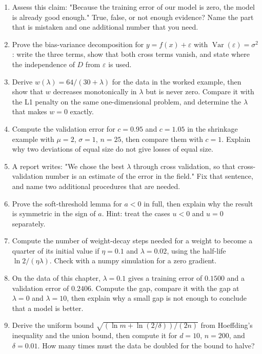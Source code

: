 \begin{latihan}
\begin{enumerate}
  \item Assess this claim: "Because the training error of our model is zero, the model
        is already good enough." True, false, or not enough evidence? Name the part that
        is mistaken and one additional number that you need.
  \item Prove the bias-variance decomposition for $y=f(x)+\varepsilon$ with
        $\operatorname{Var}(\varepsilon)=\sigma^2$: write the three terms, show that both
        cross terms vanish, and state where the independence of $D$ from $\varepsilon$
        is used.
  \item Derive $w(\lambda)=64/(30+\lambda)$ for the data in the worked example, then show
        that $w$ decreases monotonically in $\lambda$ but is never zero. Compare it with
        the L1 penalty on the same one-dimensional problem, and determine the $\lambda$
        that makes $w=0$ exactly.
  \item Compute the validation error for $c=0.95$ and $c=1.05$ in the shrinkage example
        with $\mu=2$, $\sigma=1$, $n=25$, then compare them with $c=1$. Explain why two
        deviations of equal size do not give losses of equal size.
  \item A report writes: "We chose the best $\lambda$ through cross validation, so that
        cross-validation number is an estimate of the error in the field." Fix that
        sentence, and name two additional procedures that are needed.
  \item Prove the soft-threshold lemma for $a<0$ in full, then explain why the result is
        symmetric in the sign of $a$. Hint: treat the cases $u<0$ and $u=0$ separately.
  \item Compute the number of weight-decay steps needed for a weight to become a quarter
        of its initial value if $\eta=0.1$ and $\lambda=0.02$, using the half-life
        $\ln2/(\eta\lambda)$. Check with a numpy simulation for a zero gradient.
  \item On the data of this chapter, $\lambda=0.1$ gives a training error of $0.1500$ and
        a validation error of $0.2406$. Compute the gap, compare it with the gap at
        $\lambda=0$ and $\lambda=10$, then explain why a small gap is not enough to
        conclude that a model is better.
  \item Derive the uniform bound $\sqrt{(\ln m+\ln(2/\delta))/(2n)}$ from Hoeffding's
        inequality and the union bound, then compute it for $d=10$, $n=200$, and
        $\delta=0.01$. How many times must the data be doubled for the bound to halve?
\end{enumerate}


\end{latihan}
